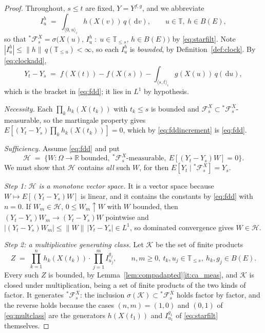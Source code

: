\documentclass[11pt,a4paper]{article}
\theoremstyle{plain}
\theoremstyle{definition}
\theoremstyle{remark}
\newcommand{\R}{\mathbb{R}}
\newcommand{\T}{\mathbb{T}}                     %
\newcommand{\Bdd}{B}                           %
\newcommand{\Filt}{\mathcal{F}}
\newcommand{\dif}{\,\mathrm{d}}
\begin{document}
\begin{proof}
  Throughout, $s \leq t$ are fixed, $Y = Y^{f,g}$, and we abbreviate
  \[
    I^h_u \;=\; \int_{\langle 0,u \rangle_\iota} h(X(v))\, q(\dif v) ,
    \qquad u \in \T,\ h \in \Bdd(E) ,
  \]
  so that ${}^{*}\Filt^X_s = \sigma\bigl( X(u),\, I^h_u \;:\; u \in \T_{\leq s},\,
  h \in \Bdd(E) \bigr)$ by \eqref{eq:starfilt}.  Note $|I^h_u| \leq \lVert h
  \rVert\, q(\T_{\leq u}) < \infty$, so each $I^h_u$ is \emph{bounded}, by
  Definition~\ref{def:clock}.  By \eqref{eq:clockadd},
  \begin{equation}
    \label{eq:fddincrement}
    Y_t - Y_s \;=\; f(X(t)) - f(X(s))
      - \int_{\langle s,t \rangle_\iota} g(X(u))\, q(\dif u) ,
  \end{equation}
  which is the bracket in \eqref{eq:fdd}; it lies in $L^1$ by hypothesis.

  \emph{Necessity.}  Each $\prod_k h_k(X(t_k))$ with $t_k \leq s$ is bounded and
  $\Filt^X_s \subset {}^{*}\Filt^X_s$-measurable, so the martingale property gives
  $E[(Y_t - Y_s)\prod_k h_k(X(t_k))] = 0$, which by \eqref{eq:fddincrement} is
  \eqref{eq:fdd}.

  \emph{Sufficiency.}  Assume \eqref{eq:fdd} and put
  \[
    \mathcal{H} \;=\; \bigl\{ W : \Omega \to \R \ \text{bounded},\
      {}^{*}\Filt^X_s\text{-measurable},\ E[(Y_t - Y_s) W] = 0 \bigr\} .
  \]
  We must show that $\mathcal{H}$ contains \emph{all} such $W$, for then
  $E[Y_t \mid {}^{*}\Filt^X_s] = Y_s$.

  \emph{Step 1: $\mathcal{H}$ is a monotone vector space.}  It is a vector space
  because $W \mapsto E[(Y_t-Y_s)W]$ is linear, and it contains the constants by
  \eqref{eq:fdd} with $n = 0$.  If $W_m \in \mathcal{H}$, $0 \leq W_m \uparrow W$
  with $W$ bounded, then $(Y_t-Y_s)W_m \to (Y_t-Y_s)W$ pointwise and
  $|(Y_t-Y_s)W_m| \leq \lVert W \rVert\, |Y_t - Y_s| \in L^1$, so dominated
  convergence gives $W \in \mathcal{H}$.

  \emph{Step 2: a multiplicative generating class.}  Let $\mathcal{K}$ be the set
  of finite products
  \begin{equation}
    \label{eq:multclass}
    Z \;=\; \prod_{k=1}^n h_k(X(t_k)) \cdot \prod_{j=1}^m I^{g_j}_{u_j} ,
    \qquad n,m \geq 0,\ t_k, u_j \in \T_{\leq s},\ h_k, g_j \in \Bdd(E) .
  \end{equation}
  Every such $Z$ is bounded, by
  Lemma~\ref{lem:compadapted}\ref{it:ca_meas}, and $\mathcal{K}$ is closed under
  multiplication, being a set of finite products of the two kinds of factor.  It
  generates ${}^{*}\Filt^X_s$: the inclusion
  $\sigma(\mathcal{K}) \subset {}^{*}\Filt^X_s$ holds factor by factor, and the
  reverse holds because the cases $(n,m) = (1,0)$ and $(0,1)$ of
  \eqref{eq:multclass} are the generators $h(X(t_1))$ and $I^{g_1}_{u_1}$ of
  \eqref{eq:starfilt} themselves.


\end{proof}
\end{document}
